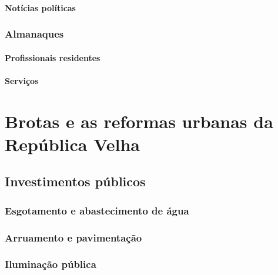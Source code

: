 \documentclass[
	12pt,					%
	openright,			%
	twoside,			%
	a4paper,			%
	english,				%
	french,				%
	spanish,			%
	brazil				%
	]{abntex2}
\begin{document}
\subsubsection{Notícias políticas}\label{subsubsec:2.5.1.2}

\lipsum[50]

\subsection{Almanaques}\label{subsec:2.5.2}

\lipsum[50]

\subsubsection{Profissionais residentes}\label{subsubsec:2.5.2.1}

\lipsum[50]

\subsubsection{Serviços}\label{subsubsec:2.5.2.2}

\lipsum[50]

\chapter{Brotas e as reformas urbanas da República Velha}\label{cap:3}

\lipsum[50]

\section{Investimentos públicos}\label{sec:3.1}

\lipsum[50]

\subsection{Esgotamento e abastecimento de água}\label{subsec:3.1.1}

\lipsum[50]

\subsection{Arruamento e pavimentação}\label{subsec:3.1.2}

\lipsum[50]

\subsection{Iluminação pública}\label{subsec:3.1.3}
\end{document}
